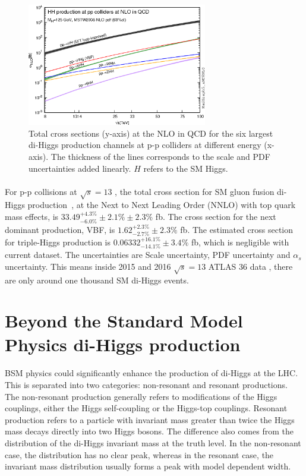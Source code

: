 \begin{figure}[h!]
  \centering
  \captionsetup{justification=centering}
  \includegraphics[width=0.7\textwidth]{figures/theory/HH_xsec}
  \caption{Total cross sections (y-axis) at the NLO in QCD for the six largest di-Higgs production channels at p-p colliders at different energy (x-axis). The thickness of the lines corresponds to the scale and PDF uncertainties added linearly. $H$ refers to the SM Higgs.}
  \label{fig:SM_HH_xsec}
\end{figure}

\paragraph{}
For p-p collisions at $\sqrt{s}=13$ \TeV, the total cross section for SM gluon fusion di-Higgs production~\cite{LHCYellow}, at the Next to Next Leading Order (NNLO) with top quark mass effects, is $33.49^{+ 4.3 \%}_{-6.0 \%} \pm 2.1\% \pm 2.3\%$ fb. The cross section for the next dominant production, VBF, is $1.62^{+ 2.3 \%}_{-2.7 \%} \pm 2.3\%$ fb. The estimated cross section for triple-Higgs production is $0.06332 ^{+ 16.1 \%}_{-14.1 \%} \pm 3.4\% $ fb, which is negligible with current dataset. The uncertainties are Scale uncertainty, PDF uncertainty and $\alpha_s$ uncertainty. This means inside 2015 and 2016 $\sqrt{s}=13$ \TeV ATLAS 36 \ifb data , there are only around one thousand SM di-Higgs events.


\section{Beyond the Standard Model Physics di-Higgs production}
\paragraph{}
BSM physics could significantly enhance the production of di-Higgs at the LHC. This is separated into two categories: non-resonant and resonant productions. The non-resonant production generally refers to modifications of the Higgs couplings, either the Higgs self-coupling or the Higgs-top couplings. Resonant production refers to a particle with invariant mass greater than twice the Higgs mass decays directly into two Higgs bosons. The difference also comes from the distribution of the di-Higgs invariant mass at the truth level. In the non-resonant case, the distribution has no clear peak, whereas in the resonant case, the invariant mass distribution usually forms a peak with model dependent width.

